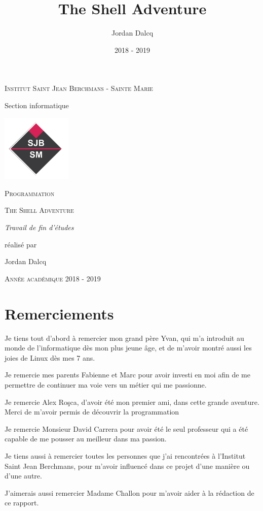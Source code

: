 \documentclass{report}
\begin{document}
\begin{titlepage}
  \centering
  {\scshape Institut Saint Jean Berchmans - Sainte Marie\par\vspace{0.2cm} Section informatique\par \vspace{0.2cm}}
  \vspace{1cm}
  \includegraphics[width=0.25\textwidth]{img/image2}\par\vspace{1cm}
  {\scshape \LARGE Programmation \par}
  \vspace{0.2cm}
	{\scshape \Large The Shell Adventure\par}
  \vspace{3cm}
  {\Large\itshape Travail de fin d'études \par réalisé par \par Jordan Dalcq \par}
  \vfill
  \scshape Année académique 2018 - 2019
  \title{The Shell Adventure}
  \author{Jordan Dalcq}
  \date{2018 - 2019}
\end{titlepage}

\pagestyle{headings}
\tableofcontents
\part*{Remerciements}

Je tiens tout d'abord à remercier mon grand père Yvan, qui m'a introduit au monde de l'informatique dès mon plus jeune âge, et de m'avoir montré aussi les joies de Linux dès mes 7 ans.
\newline
\par Je remercie mes parents Fabienne et Marc pour avoir investi en moi afin de me permettre de continuer ma voie vers un métier qui me passionne.
\newline
\par Je remercie Alex Roşca, d'avoir été mon premier ami, dans cette grande aventure. Merci de m'avoir permis de découvrir la programmation
\newline
\par Je remercie Monsieur David Carrera pour avoir été le seul professeur qui a été capable de me pousser au meilleur dans ma passion.
\newline
\par Je tiens aussi à remercier toutes les personnes que j'ai rencontrées à l'Institut Saint Jean Berchmans, pour m'avoir influencé dans ce projet d'une manière ou d'une autre.
\newline
\par J'aimerais aussi remercier Madame Challon pour m'avoir aider à la rédaction de ce rapport.
\end{document}
